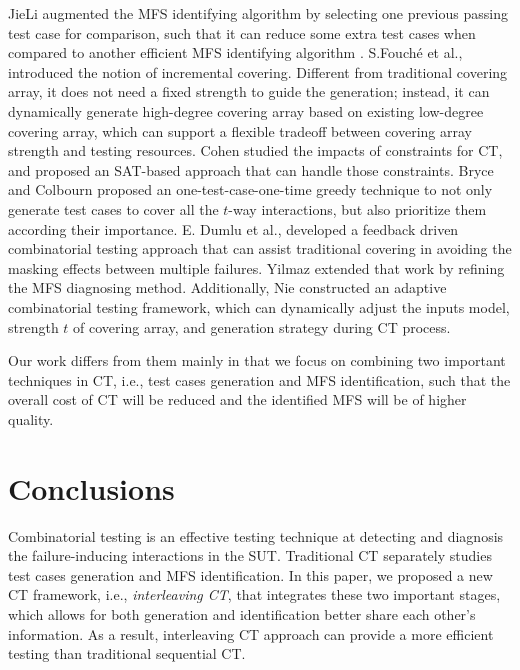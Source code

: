 \documentclass{sig-alternate}
\begin{document}

JieLi \cite{li2012improved} augmented the MFS identifying algorithm by selecting one previous passing test case for comparison, such that it can reduce some extra test cases when compared to another efficient MFS identifying algorithm \cite{zhang2011characterizing}. S.Fouch{\'e}  et al., \cite{fouche2009incremental} introduced the notion of incremental covering. Different from traditional covering array, it does not need a fixed strength to guide the generation; instead, it can dynamically generate high-degree covering array based on existing low-degree covering array, which can support a flexible tradeoff between covering array strength and testing resources. Cohen \cite{cohen2007exploiting,cohen2008constructing} studied the impacts of constraints for CT, and proposed an SAT-based approach that can handle those constraints.  Bryce and Colbourn \cite{bryce2006prioritized} proposed an one-test-case-one-time greedy technique to not only generate test cases to cover all the $t$-way interactions, but also prioritize them according their importance.  E. Dumlu et al., \cite{dumlu2011feedback} developed a feedback driven
combinatorial testing approach that can assist traditional covering in avoiding the masking effects between multiple failures. Yilmaz \cite{yilmaz2013reducing} extended that work by refining the MFS diagnosing method. Additionally, Nie \cite{nie2013adaptive} constructed an adaptive combinatorial testing framework, which can dynamically adjust the inputs model, strength $t$ of covering array, and generation strategy during CT process.

Our work differs from them mainly in that we focus on combining two important techniques in CT, i.e., test cases generation and MFS identification, such that the overall cost of CT will be reduced and the identified MFS will be of higher quality.



\section{Conclusions}
Combinatorial testing is an effective testing technique at detecting and diagnosis the failure-inducing interactions in the SUT. Traditional CT separately studies test cases generation and MFS identification. In this paper, we proposed a new CT framework, i.e., \emph{interleaving CT}, that integrates these two important stages, which allows for both generation and identification better share each other's information. As a result, interleaving CT approach can provide a more efficient testing than traditional sequential CT.
\end{document}
